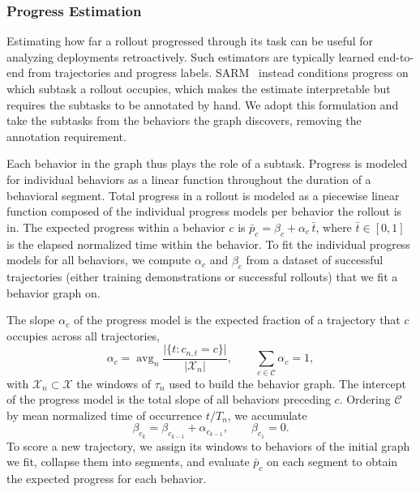 \documentclass[letterpaper, 10 pt, conference]{ieeeconf}
\newcommand{\rollout}{\tau}
\DeclareMathOperator*{\avg}{avg}
\begin{document}
\subsubsection{Progress Estimation}
\label{sec:progress_method}

Estimating how far a rollout progressed through its task can be useful for analyzing deployments retroactively. Such estimators are typically learned end-to-end from trajectories and progress labels. SARM~\cite{chen_sarm_2025} instead conditions progress on which subtask a rollout occupies, which makes the estimate interpretable but requires the subtasks to be annotated by hand. We adopt this formulation and take the subtasks from the behaviors the graph discovers, removing the annotation requirement.
 
Each behavior in the graph thus plays the role of a subtask. Progress is modeled for individual behaviors as a linear function throughout the duration of a behavioral segment. Total progress in a rollout is modeled as a piecewise linear function composed of the individual progress models per behavior the rollout is in. The expected progress within a behavior \(c\) is \(\bar{p}_c = \beta_c + \alpha_c \, \bar{t}\), where \(\bar{t} \in [0, 1]\) is the elapsed normalized time within the behavior. To fit the individual progress models for all behaviors, we compute \(\alpha_c\) and \(\beta_c\) from a dataset of successful trajectories (either training demonstrations or successful rollouts) that we fit a behavior graph on.
 
The slope \(\alpha_c\) of the progress model is the expected fraction of a trajectory that \(c\) occupies across all trajectories,
\begin{equation}
  \alpha_c = \avg_n \frac{\bigl| \{ t : c_{n,t} = c \} \bigr|}{\lvert \mathcal{X}_n \rvert},
  \qquad \textstyle\sum_{c \in \mathcal{C}} \alpha_c = 1,
  \label{eq:stage_span}
\end{equation}
with \(\mathcal{X}_n \subset \mathcal{X}\) the windows of \(\rollout_n\) used to build the behavior graph. The intercept of the progress model is the total slope of all behaviors preceding \(c\). Ordering \(\mathcal{C}\) by mean normalized time of occurrence \(t / T_n\), we accumulate
\begin{equation}
  \beta_{c_k} = \beta_{c_{k-1}} + \alpha_{c_{k-1}},
  \qquad \beta_{c_1} = 0.
  \label{eq:stage_base}
\end{equation}
To score a new trajectory, we assign its windows to behaviors of the initial graph we fit, collapse them into segments, and evaluate \(\bar{p}_c\) on each segment to obtain the expected progress for each behavior.
\end{document}
